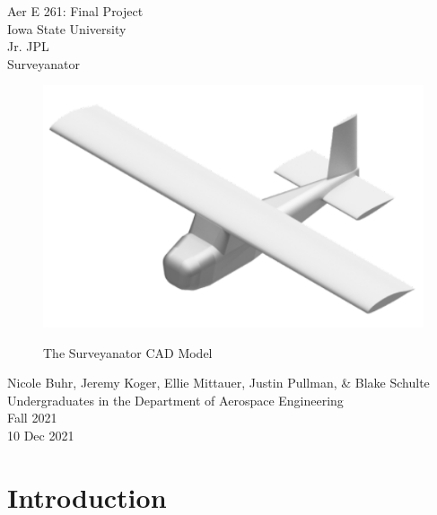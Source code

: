\documentclass[12pt,A4paper]{article}
\begin{document}
	\thispagestyle{empty}
	\begin{center}
		\Huge
		Aer E 261: Final Project \\
		Iowa State University \\
		Jr. JPL \\
		Surveyanator \\
		\vspace{0.25 in}
		
		
		\begin{figure}[!h]
			\centering
			\vspace{0.5 in}
			\includegraphics[width=1\textwidth]{IsoCad.png}
			\label{fig:f1}
			\caption{The Surveyanator CAD Model}
		\end{figure}
		\vspace*{\fill}
		\large
		Nicole Buhr, Jeremy Koger, Ellie Mittauer, Justin Pullman, \& Blake Schulte \\
		\vspace{0.25 in}
		Undergraduates in the Department of Aerospace Engineering \\
		Fall 2021 \\
		10 Dec 2021 
		\clearpage
	\end{center}

	
	\setcounter{page}{2}
	
	\tableofcontents

	\renewcommand\listfigurename{List of Illustrations}
	\listoffigures

	\clearpage
	\section{Introduction}
	\indent 
\end{document}
